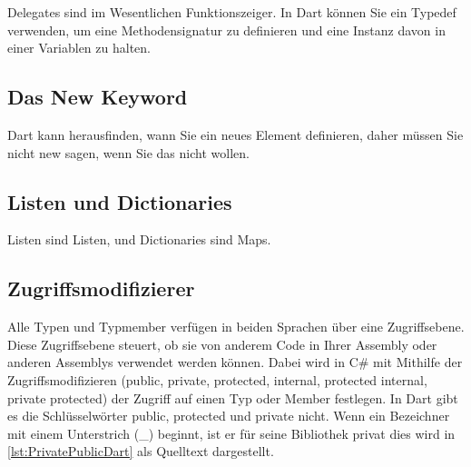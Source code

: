 Delegates sind im Wesentlichen Funktionszeiger. In Dart können Sie ein Typedef verwenden, um eine Methodensignatur zu definieren und eine Instanz davon in einer Variablen zu halten.


\begin{minipage}{\linewidth}

\end{minipage}

\subsection{Das New Keyword}


Dart kann herausfinden, wann Sie ein neues Element definieren, daher müssen Sie nicht new sagen, wenn Sie das nicht wollen.

\begin{minipage}{\linewidth}

\end{minipage}


\subsection{Listen und Dictionaries}

Listen sind Listen, und Dictionaries sind Maps.


\begin{minipage}{\linewidth}

\end{minipage}



\subsection{Zugriffsmodifizierer}

Alle Typen und Typmember verfügen in beiden Sprachen über eine Zugriffsebene.  Diese Zugriffsebene steuert, ob sie von anderem Code in Ihrer Assembly oder anderen Assemblys verwendet werden können.  Dabei wird in C\# mit Mithilfe der Zugriffsmodifizieren (public,  private,  protected,  internal,  protected internal,  private protected) der Zugriff auf einen Typ oder Member festlegen.  In Dart gibt es die Schlüsselwörter public,  protected und private nicht. Wenn ein Bezeichner mit einem Unterstrich (\_) beginnt, ist er für seine Bibliothek privat dies wird in \ref{lst:PrivatePublicDart} als Quelltext dargestellt. 

